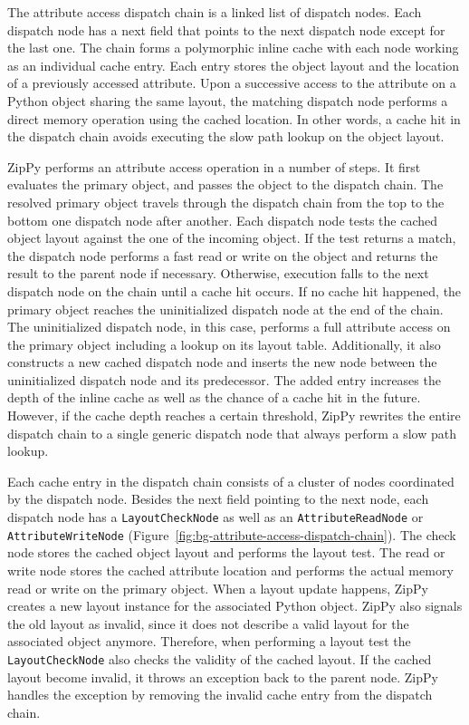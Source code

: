 The attribute access dispatch chain is a linked list of dispatch nodes.
Each dispatch node has a \textsf{next} field that points to the next dispatch node except for the last one.
The chain forms a polymorphic inline cache with each node working as an individual cache entry.
Each entry stores the object layout and the location of a previously accessed attribute.
Upon a successive access to the attribute on a Python object sharing the same layout, the matching dispatch node performs a direct memory operation using the cached location.
In other words, a cache hit in the dispatch chain avoids executing the slow path lookup on the object layout.

ZipPy performs an attribute access operation in a number of steps.
It first evaluates the primary object, and passes the object to the dispatch chain.
The resolved primary object travels through the dispatch chain from the top to the bottom one dispatch node after another.
Each dispatch node tests the cached object layout against the one of the incoming object.
If the test returns a match, the dispatch node performs a fast read or write on the object and returns the result to the parent node if necessary.
Otherwise, execution falls to the next dispatch node on the chain until a cache hit occurs.
If no cache hit happened, the primary object reaches the uninitialized dispatch node at the end of the chain.
The uninitialized dispatch node, in this case, performs a full attribute access on the primary object including a lookup on its layout table.
Additionally, it also constructs a new cached dispatch node and inserts the new node between the uninitialized dispatch node and its predecessor.
The added entry increases the depth of the inline cache as well as the chance of a cache hit in the future.
However, if the cache depth reaches a certain threshold, ZipPy rewrites the entire dispatch chain to a single generic dispatch node that always perform a slow path lookup.

Each cache entry in the dispatch chain consists of a cluster of nodes coordinated by the dispatch node.
Besides the \textsf{next} field pointing to the next node, each dispatch node has a \texttt{LayoutCheckNode} as well as an \texttt{AttributeReadNode} or \texttt{AttributeWriteNode} (Figure~\ref{fig:bg-attribute-access-dispatch-chain}).
The \textsf{check} node stores the cached object layout and performs the layout test.
The \textsf{read} or \textsf{write} node stores the cached attribute location and performs the actual memory read or write on the primary object.
When a layout update happens, ZipPy creates a new layout instance for the associated Python object.
ZipPy also signals the old layout as invalid, since it does not describe a valid layout for the associated object anymore.
Therefore, when performing a layout test the \texttt{LayoutCheckNode} also checks the validity of the cached layout.
If the cached layout become invalid, it throws an exception back to the parent node.
ZipPy handles the exception by removing the invalid cache entry from the dispatch chain.

